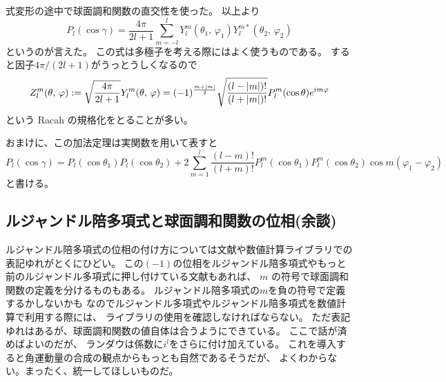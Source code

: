 \documentclass[../master.tex]{subfiles}
\begin{document}
式変形の途中で球面調和関数の直交性を使った。
以上より
\begin{equation}
	P_l(\cos\gamma) = \frac{4\pi}{2l+1}\sum_{m=-l}^{l} Y_l^m(\theta_1,\,\varphi_1) Y_l^{m*}(\theta_2,\,\varphi_2)
\end{equation}
というのが言えた。
この式は多極子を考える際にはよく使うものである。
すると因子\(4\pi/(2l+1)\)がうっとうしくなるので
\begin{equation}
	Z_l^m(\theta,\,\varphi) := \sqrt{\frac{4\pi}{2l+1}} Y_l^m(\theta,\,\varphi)
	= (-1)^{\frac{m+\abs{m}}{2}}\sqrt{\frac{(l-\abs{m})!}{(l+\abs{m})!}}P_l^m(\cos\theta)e^{im\varphi}
\end{equation}
という Racah の規格化をとることが多い。

おまけに、この加法定理は実関数を用いて表すと
\begin{equation}
	P_l(\cos\gamma) = P_l(\cos\theta_1)P_l(\cos\theta_2)
	+ 2\sum_{m=1}^{l}\frac{(l-m)!}{(l+m)!}P_l^m(\cos\theta_1)P_l^m(\cos\theta_2)\cos m(\varphi_1-\varphi_2)
\end{equation}
と書ける。

\subsection{ルジャンドル陪多項式と球面調和関数の位相(余談)}

ルジャンドル陪多項式の位相の付け方については文献や数値計算ライブラリでの表記ゆれがとくにひどい。
この\((-1)\)の位相をルジャンドル陪多項式やもっと前のルジャンドル多項式に押し付けている文献もあれば、
\(m\) の符号で球面調和関数の定義を分けるものもある。
ルジャンドル陪多項式の\(m\)を負の符号で定義するかしないかも
なのでルジャンドル多項式やルジャンドル陪多項式を数値計算で利用する際には、
ライブラリの使用を確認しなければならない。
ただ表記ゆれはあるが、球面調和関数の値自体は合うようにできている。
ここで話が済めばよいのだが、
ランダウは係数に\(i^l\)をさらに付け加えている。
これを導入すると角運動量の合成の観点からもっとも自然であるそうだが、
よくわからない。まったく、統一してほしいものだ。


\end{document}
